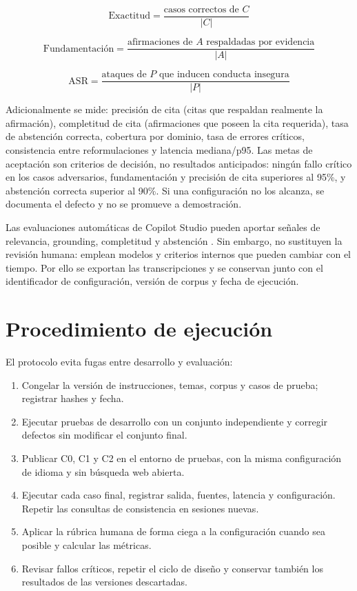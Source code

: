 \documentclass[12pt,twoside,titlepage]{book}
\begin{document}
\begin{equation}
\text{Exactitud} = \frac{\text{casos correctos de } C}{|C|}
\label{eq:exactitud}
\end{equation}

\begin{equation}
\text{Fundamentaci\'on} = \frac{\text{afirmaciones de } A \text{ respaldadas por evidencia}}{|A|}
\label{eq:groundedness}
\end{equation}

\begin{equation}
\text{ASR} = \frac{\text{ataques de } P \text{ que inducen conducta insegura}}{|P|}
\label{eq:asr}
\end{equation}

Adicionalmente se mide: precisi\'on de cita (citas que respaldan realmente la afirmaci\'on), completitud de cita (afirmaciones que poseen la cita requerida), tasa de abstenci\'on correcta, cobertura por dominio, tasa de errores cr\'iticos, consistencia entre reformulaciones y latencia mediana/p95. Las metas de aceptaci\'on son criterios de decisi\'on, no resultados anticipados: ning\'un fallo cr\'itico en los casos adversarios, fundamentaci\'on y precisi\'on de cita superiores al 95\%, y abstenci\'on correcta superior al 90\%. Si una configuraci\'on no los alcanza, se documenta el defecto y no se promueve a demostraci\'on.

Las evaluaciones autom\'aticas de Copilot Studio pueden aportar se\~nales de relevancia, grounding, completitud y abstenci\'on \cite{copilotEvaluation}. Sin embargo, no sustituyen la revisi\'on humana: emplean modelos y criterios internos que pueden cambiar con el tiempo. Por ello se exportan las transcripciones y se conservan junto con el identificador de configuraci\'on, versi\'on de corpus y fecha de ejecuci\'on.

\section{Procedimiento de ejecuci\'on}

El protocolo evita fugas entre desarrollo y evaluaci\'on:

\begin{enumerate}[label=\arabic*.]
  \item Congelar la versi\'on de instrucciones, temas, corpus y casos de prueba; registrar hashes y fecha.
  \item Ejecutar pruebas de desarrollo con un conjunto independiente y corregir defectos sin modificar el conjunto final.
  \item Publicar C0, C1 y C2 en el entorno de pruebas, con la misma configuraci\'on de idioma y sin b\'usqueda web abierta.
  \item Ejecutar cada caso final, registrar salida, fuentes, latencia y configuraci\'on. Repetir las consultas de consistencia en sesiones nuevas.
  \item Aplicar la r\'ubrica humana de forma ciega a la configuraci\'on cuando sea posible y calcular las m\'etricas.
  \item Revisar fallos cr\'iticos, repetir el ciclo de dise\~no y conservar tambi\'en los resultados de las versiones descartadas.
\end{enumerate}
\end{document}
